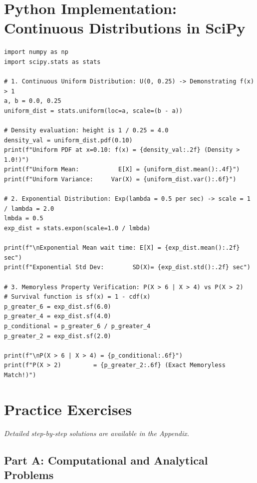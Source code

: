 \section{Python Implementation: Continuous Distributions in SciPy}

\begin{lstlisting}[caption={Continuous Uniform and Exponential Distributions in Python}]
import numpy as np
import scipy.stats as stats

# 1. Continuous Uniform Distribution: U(0, 0.25) -> Demonstrating f(x) > 1
a, b = 0.0, 0.25
uniform_dist = stats.uniform(loc=a, scale=(b - a))

# Density evaluation: height is 1 / 0.25 = 4.0
density_val = uniform_dist.pdf(0.10)
print(f"Uniform PDF at x=0.10: f(x) = {density_val:.2f} (Density > 1.0!)")
print(f"Uniform Mean:           E[X] = {uniform_dist.mean():.4f}")
print(f"Uniform Variance:     Var(X) = {uniform_dist.var():.6f}")

# 2. Exponential Distribution: Exp(lambda = 0.5 per sec) -> scale = 1 / lambda = 2.0
lmbda = 0.5
exp_dist = stats.expon(scale=1.0 / lmbda)

print(f"\nExponential Mean wait time: E[X] = {exp_dist.mean():.2f} sec")
print(f"Exponential Std Dev:        SD(X)= {exp_dist.std():.2f} sec")

# 3. Memoryless Property Verification: P(X > 6 | X > 4) vs P(X > 2)
# Survival function is sf(x) = 1 - cdf(x)
p_greater_6 = exp_dist.sf(6.0)
p_greater_4 = exp_dist.sf(4.0)
p_conditional = p_greater_6 / p_greater_4
p_greater_2 = exp_dist.sf(2.0)

print(f"\nP(X > 6 | X > 4) = {p_conditional:.6f}")
print(f"P(X > 2)         = {p_greater_2:.6f} (Exact Memoryless Match!)")
\end{lstlisting}

\newpage
\section{Practice Exercises}
\textit{Detailed step-by-step solutions are available in the Appendix.}

\subsection*{Part A: Computational and Analytical Problems}

